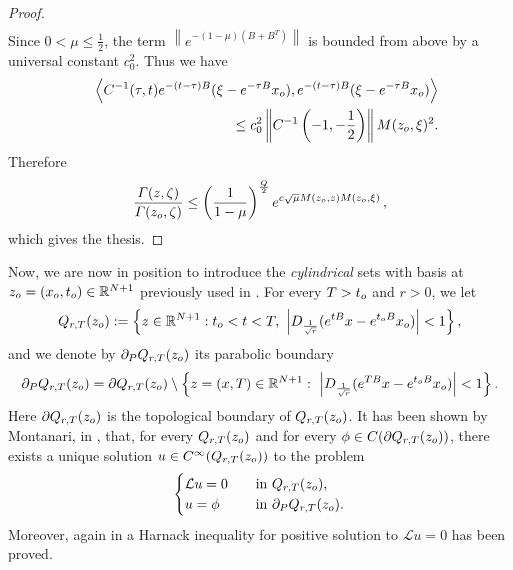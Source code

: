 \documentclass{amsart}
\numberwithin{equation}{section}
\def \p{{\phi}}
\def \Lc{{\mathcal{L}}}
\def \r{{\mathbb{R}}}
\renewcommand{\Gamma}{\varGamma}
\begin{document}
{{\begin{proof}
\begin{eqnarray*}
\end{eqnarray*}
Since $0<\mu\leq\frac{1}{2}$, the term $\left\|e^{-(1-\mu)(B+B^T)}\right\|$ is bounded from above by a universal constant $c_0^2$. Thus we have
\begin{eqnarray*}
&& \left\langle C^{-1}(\tau,t)e^{-(t-\tau)B}(\xi -e^{-\tau B}x_{\rm o}),e^{-(t-\tau)B}(\xi -e^{-\tau B}x_{\rm o})\right\rangle\notag\\
&& \qquad\quad \leq c_0^2 \left\|C^{-1}\left(-1,-\frac{1}{2}\right)\right\|M(z_{\rm o},\xi)^2.
\end{eqnarray*}
Therefore
\[
\frac{\Gamma(z,\zeta)}{\Gamma(z_{\rm o},\zeta)}\leq\left(\frac{1}{1-\mu}\right)^{\frac{Q}{2}}e^{c\sqrt{\mu} M(z_{\rm o},z) M(z_{\rm o},\xi)}\,,
\]
which gives the thesis.
\end{proof}
}
Now, we are now in position to introduce the \textit{cylindrical} sets with basis at $z_{\rm o}=(x_{\rm o},t_{\rm o}) \in \r^{N+1}$ previously used in \cite{Mon96}. For every $T > t_{\rm o}$ and $r>0$, we let
\begin{equation} \label{Kolm cylinder}
	{Q}_{r,T}(z_{\rm o})  :=  \left\{z \in \r^{N+1} : t_{\rm o} < t< T, \ \left| D_{\frac{1}{\sqrt{r}}}(e^{t B}x-e^{t_{\rm o}B}x_{\rm o})\right|<1\right\},
\end{equation}
and we denote by $\partial_P{Q}_{r,T}(z_{\rm o})$ its parabolic boundary
\begin{equation*}
\partial_P{Q}_{r,T}(z_{\rm o})  =  \partial {Q}_{r,T}(z_{\rm o}) \setminus \left\{z=(x,T) \in \r^{N+1} : \ \left| D_{\frac{1}{\sqrt{r}}}(e^{T B}x-e^{t_{\rm o}B}x_{\rm o})\right|<1\right\}.
\end{equation*}
Here $\partial {Q}_{r,T}(z_{\rm o})$ is the topological boundary of ${Q}_{r,T}(z_{\rm o})$.
It has been shown by Montanari, in \cite{Mon96}, that, for every ${Q}_{r,T}(z_{\rm o})$ and for every $\p \in {C}(\partial{Q}_{r,T}(z_{\rm o}))$, there exists a unique solution $u \in {C}^{\infty}({Q}_{r,T}(z_{\rm o}))$  to the problem
\begin{equation}
	\label{pbm on cylinder}
	\begin{cases}
		\Lc u =0 \quad & \text{in} \ {Q}_{r,T}(z_{\rm o}),\\
		u =\p \quad & \text{in} \ \partial_P{Q}_{r,T}(z_{\rm o}).
	\end{cases}
\end{equation}
Moreover, again in \cite[Theorem 3.1]{Mon96} a Harnack inequality for positive solution to $\Lc u =0$ has been  proved.

}
\end{document}
